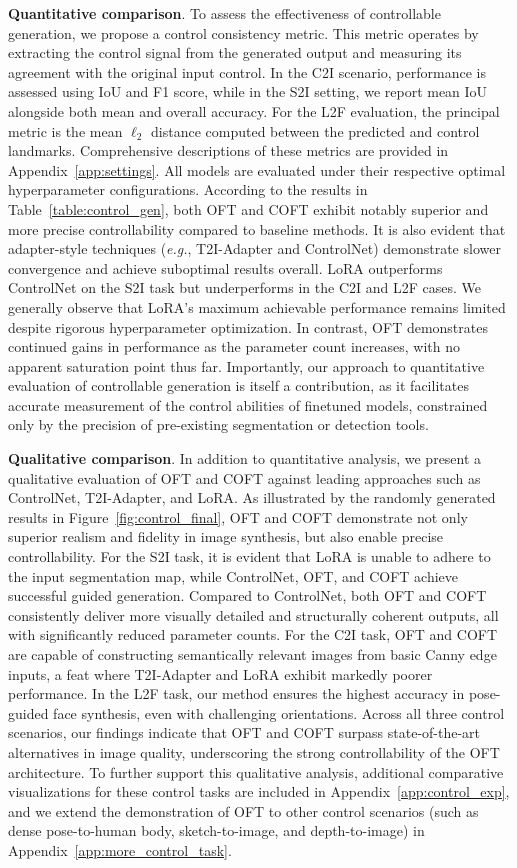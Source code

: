 \textbf{Quantitative comparison}. To assess the effectiveness of controllable generation, we propose a control consistency metric. This metric operates by extracting the control signal from the generated output and measuring its agreement with the original input control. In the C2I scenario, performance is assessed using IoU and F1 score, while in the S2I setting, we report mean IoU alongside both mean and overall accuracy. For the L2F evaluation, the principal metric is the mean $\ell_2$ distance computed between the predicted and control landmarks. Comprehensive descriptions of these metrics are provided in Appendix~\ref{app:settings}. All models are evaluated under their respective optimal hyperparameter configurations. According to the results in Table~\ref{table:control_gen}, both OFT and COFT exhibit notably superior and more precise controllability compared to baseline methods. It is also evident that adapter-style techniques (\emph{e.g.}, T2I-Adapter and ControlNet) demonstrate slower convergence and achieve suboptimal results overall. LoRA outperforms ControlNet on the S2I task but underperforms in the C2I and L2F cases. We generally observe that LoRA’s maximum achievable performance remains limited despite rigorous hyperparameter optimization. In contrast, OFT demonstrates continued gains in performance as the parameter count increases, with no apparent saturation point thus far. Importantly, our approach to quantitative evaluation of controllable generation is itself a contribution, as it facilitates accurate measurement of the control abilities of finetuned models, constrained only by the precision of pre-existing segmentation or detection tools.

\textbf{Qualitative comparison}. In addition to quantitative analysis, we present a qualitative evaluation of OFT and COFT against leading approaches such as ControlNet, T2I-Adapter, and LoRA. As illustrated by the randomly generated results in Figure~\ref{fig:control_final}, OFT and COFT demonstrate not only superior realism and fidelity in image synthesis, but also enable precise controllability. For the S2I task, it is evident that LoRA is unable to adhere to the input segmentation map, while ControlNet, OFT, and COFT achieve successful guided generation. Compared to ControlNet, both OFT and COFT consistently deliver more visually detailed and structurally coherent outputs, all with significantly reduced parameter counts. For the C2I task, OFT and COFT are capable of constructing semantically relevant images from basic Canny edge inputs, a feat where T2I-Adapter and LoRA exhibit markedly poorer performance. In the L2F task, our method ensures the highest accuracy in pose-guided face synthesis, even with challenging orientations. Across all three control scenarios, our findings indicate that OFT and COFT surpass state-of-the-art alternatives in image quality, underscoring the strong controllability of the OFT architecture. To further support this qualitative analysis, additional comparative visualizations for these control tasks are included in Appendix~\ref{app:control_exp}, and we extend the demonstration of OFT to other control scenarios (such as dense pose-to-human body, sketch-to-image, and depth-to-image) in Appendix~\ref{app:more_control_task}.

